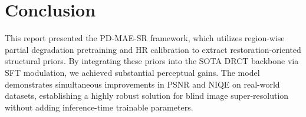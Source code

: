 \documentclass[journal,10pt,doublecolumn]{IEEEtran}
\begin{document}
\section{Conclusion}
This report presented the PD-MAE-SR framework, which utilizes region-wise partial degradation pretraining and HR calibration to extract restoration-oriented structural priors. By integrating these priors into the SOTA DRCT backbone via SFT modulation, we achieved substantial perceptual gains. The model demonstrates simultaneous improvements in PSNR and NIQE on real-world datasets, establishing a highly robust solution for blind image super-resolution without adding inference-time trainable parameters.



\end{document}
